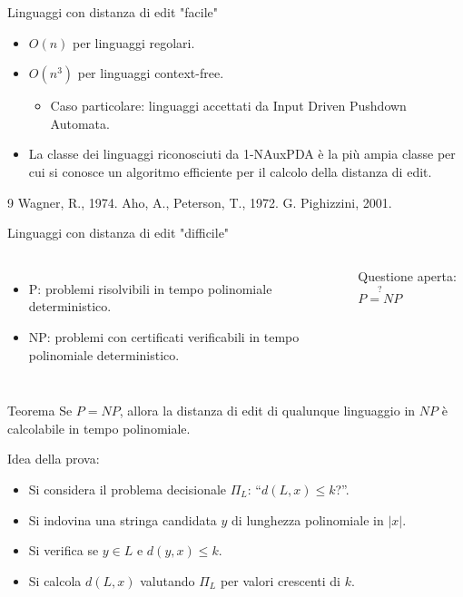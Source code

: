 \documentclass[aspectratio=169]{beamer}
\begin{document}
\begin{frame}{Linguaggi con distanza di edit "facile"}
    \begin{itemize}
        \setlength{\itemsep}{1em}
        \item $O(n)$ per linguaggi regolari.
        \item $O(n^3)$ per linguaggi context-free.
        \begin{itemize}
            \item[$\rightarrow$] Caso particolare: linguaggi accettati da Input Driven Pushdown Automata.
        \end{itemize}
        \item La classe dei linguaggi riconosciuti da 1-NAuxPDA è la più ampia classe per cui si conosce un algoritmo efficiente per il calcolo della distanza di edit.
    \end{itemize}

    \vfill
    \footnotesize
    \begin{thebibliography}{9}
        Wagner, R., 1974.
        Aho, A., Peterson, T., 1972.
        G. Pighizzini, 2001.

    \end{thebibliography}
\end{frame}

\begin{frame}{Linguaggi con distanza di edit "difficile"}
\begin{columns}[T,onlytextwidth]
    \begin{itemize}
        \item P: problemi risolvibili in tempo polinomiale deterministico.
        \item NP: problemi con certificati verificabili in tempo polinomiale deterministico.
    \end{itemize}
    \vfill
    \centering
    Questione aperta: $\stackrel{?}{P=NP}$
    \vfill
\end{columns}

\begin{block}{Teorema}
Se $P=NP$, allora la distanza di edit di qualunque linguaggio in $NP$ è calcolabile in tempo polinomiale.
\end{block}

Idea della prova:
\begin{itemize}
  \item Si considera il problema decisionale $\Pi_L$: ``$d(L,x)\le k$?''.
  \item Si indovina una stringa candidata $y$ di lunghezza polinomiale in $|x|$.
  \item Si verifica se $y \in L$ e $d(y, x) \le k$.
  \item Si calcola $d(L,x)$ valutando $\Pi_L$ per valori crescenti di $k$.
\end{itemize}
\end{frame}
\end{document}
